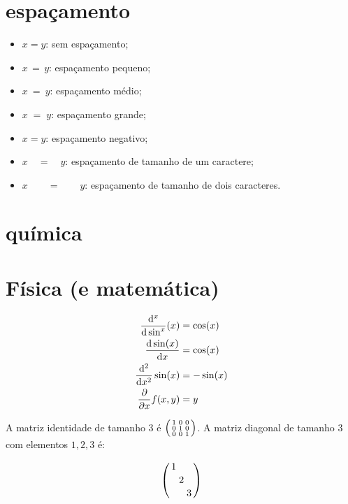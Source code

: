 \documentclass{article}
\begin{document}
\section{espaçamento}

\begin{itemize}
    \item $x = y$: sem espaçamento;
    \item $x \, = \, y$: espaçamento pequeno;
    \item $x \: = \: y$: espaçamento médio;
    \item $x \; = \; y$: espaçamento grande;
    \item $x \! = \! y$: espaçamento negativo;
    \item $x \quad = \quad y$: espaçamento de tamanho de um caractere;
    \item $x \qquad = \qquad y$: espaçamento de tamanho de dois caracteres.
\end{itemize}

\newpage

\section{química}


\section{Física (e matemática)}

\begin{align*}
\dv[x] \sin(x) &= \cos(x)\\
\dv{\sin(x)}{x} &= \cos(x)\\
\dv[2]{x} \sin(x) &= -\sin(x)\\
\pdv{x} f(x, y) &= y\\
\end{align*}

A matriz identidade de tamanho 3 é $\smqty(\imat{3})$.
\bigbreak
A matriz diagonal de tamanho 3 com elementos $1, 2, 3$ é:

\[
\smqty(\dmat{1, 2, 3})
\]
\end{document}
